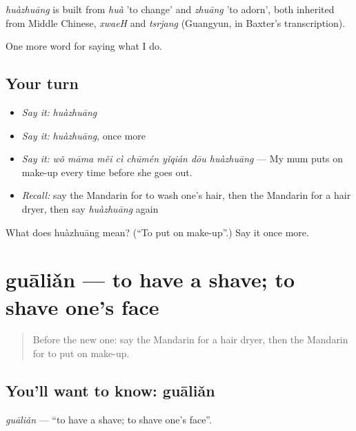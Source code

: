 \begin{cousinweb}
\emph{huàzhuāng} is built from \emph{huà} 'to change' and \emph{zhuāng} 'to adorn', both inherited from Middle Chinese, \emph{xwaeH} and \emph{tsrjang} (Guangyun, in Baxter's transcription).
\end{cousinweb}

\begin{grammarlens}[title={What you've built}]
One more word for saying what I do.
\end{grammarlens}

\subsection*{Your turn}
\begin{itemize}
\raggedright
  \item \emph{Say it:} \emph{huàzhuāng}
  \item \emph{Say it:} \emph{huàzhuāng}, once more
  \item \emph{Say it:} \emph{wǒ māma měi cì chūmén yǐqián dōu huàzhuāng} — My mum puts on make-up every time before she goes out.
  \item \emph{Recall:} say the Mandarin for to wash one's hair, then the Mandarin for a hair dryer, then say \emph{huàzhuāng} again
\end{itemize}

\begin{tcolorbox}[breakable,colback=teal!4,colframe=teal!35!black,title={Before you move on}]
What does huàzhuāng mean? (\textquotedblleft{}To put on make-up\textquotedblright{}.) Say it once more.
\end{tcolorbox}
\section[guāliǎn]{guāliǎn — to have a shave; to shave one's face}

\label{lesson:ZH-C164-gualian}



\begin{quote}
Before the new one: say the Mandarin for a hair dryer, then the Mandarin for to put on make-up.
\end{quote}

\subsection*{You'll want to know: guāliǎn}
\emph{guāliǎn} — \textquotedblleft{}to have a shave; to shave one's face\textquotedblright{}.

